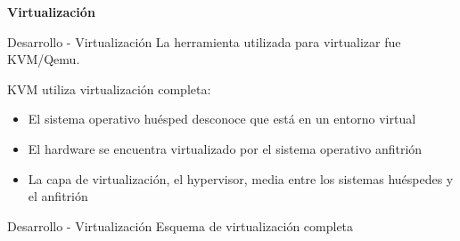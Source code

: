 
\begin{frame}
    \Huge
    \centering
    \textbf{Virtualización}

\end{frame}


\begin{frame}{Desarrollo - Virtualización}
    \vspace{-1.5cm}
    La herramienta utilizada para virtualizar fue KVM/Qemu.

    KVM utiliza virtualización completa:
    \begin{itemize}
        \item El sistema operativo huésped desconoce que está en un entorno virtual
        \item El hardware se encuentra virtualizado por el sistema operativo anfitrión
        \item La capa de virtualización, el hypervisor, media entre los sistemas huéspedes y el anfitrión
    \end{itemize}

\end{frame}

\begin{frame}{Desarrollo - Virtualización}
    \vspace{0cm} {Esquema de virtualización completa}
    \vspace{0.5cm}
    \begin{figure}[ht]
       \centering
       \vspace{-0.50cm}
    \end{figure}

\end{frame}

